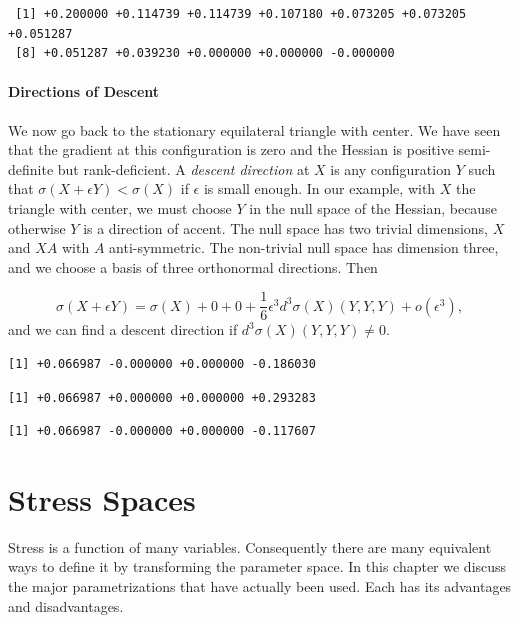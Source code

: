 \documentclass[
  12pt,
  letterpaper,
  DIV=11,
  numbers=noendperiod]{scrreprt}
\theoremstyle{remark}
\begin{document}
\begin{verbatim}
 [1] +0.200000 +0.114739 +0.114739 +0.107180 +0.073205 +0.073205 +0.051287
 [8] +0.051287 +0.039230 +0.000000 +0.000000 -0.000000
\end{verbatim}

\subsubsection{Directions of Descent}\label{directions-of-descent}

We now go back to the stationary equilateral triangle with center. We
have seen that the gradient at this configuration is zero and the
Hessian is positive semi-definite but rank-deficient. A \emph{descent
direction} at \(X\) is any configuration \(Y\) such that
\(\sigma(X+\epsilon Y)<\sigma(X)\) if \(\epsilon\) is small enough. In
our example, with \(X\) the triangle with center, we must choose \(Y\)
in the null space of the Hessian, because otherwise \(Y\) is a direction
of accent. The null space has two trivial dimensions, \(X\) and \(XA\)
with \(A\) anti-symmetric. The non-trivial null space has dimension
three, and we choose a basis of three orthonormal directions. Then

\[
\sigma(X+\epsilon Y)=\sigma(X)+0+0+\frac16\epsilon^3d^3\sigma(X)(Y,Y,Y)+o(\epsilon^3),
\] and we can find a descent direction if
\(d^3\sigma(X)(Y,Y,Y)\not= 0\).

\begin{verbatim}
[1] +0.066987 -0.000000 +0.000000 -0.186030
\end{verbatim}

\begin{verbatim}
[1] +0.066987 +0.000000 +0.000000 +0.293283
\end{verbatim}

\begin{verbatim}
[1] +0.066987 -0.000000 +0.000000 -0.117607
\end{verbatim}


\chapter{Stress Spaces}\label{propspaces}

Stress is a function of many variables. Consequently there are many
equivalent ways to define it by transforming the parameter space. In
this chapter we discuss the major parametrizations that have actually
been used. Each has its advantages and disadvantages.
\end{document}
